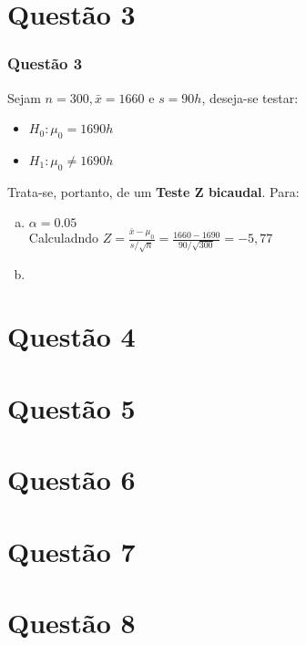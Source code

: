 \documentclass{beamer}\usepackage[]{graphicx}\usepackage[]{color}
\begin{document}
	\section{Questão 3}
		\begin{frame}
			\frametitle{Questão 3}
			Sejam $n = 300, \bar{x} = 1660$ e $s = 90h$, deseja-se testar:
			\begin{itemize}
				\item $H_{0}:  \mu_{0} = 1690h$
				\item $H_{1}:  \mu_{0} \neq 1690h$
			\end{itemize}
			Trata-se, portanto, de um \textbf{Teste Z bicaudal}.  Para:
			\begin{enumerate}[(a)]
				\item $\alpha = 0.05$\\
				Calculadndo $Z = \frac{\bar{x} - \mu_{0}}{s/\sqrt{n}} = \frac{1660-1690}{90/\sqrt{300}} = -5,77$
				\item
			\end{enumerate}
		\end{frame}
	\section{Questão 4}
	\section{Questão 5}
	\section{Questão 6}
	\section{Questão 7}
	\section{Questão 8}
\end{document}
